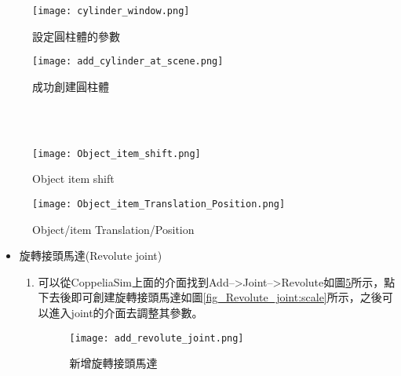 \documentclass[14pt,a4paper]{report}  %
\begin{document}
{{{\begin{itemize}
\begin{enumerate}
      \begin{figure}[hbt!]
        \centering
        \texttt{[image: cylinder\_window.png]} 
        \caption{設定圓柱體的參數}
        \label{fig_cylinder_window:scale}
      \end{figure}
      
      \begin{figure}[hbt!]
        \centering
        \texttt{[image: add\_cylinder\_at\_scene.png]} 
        \caption{成功創建圓柱體}
        \label{fig_add_cylinder_at_scene:scale}
      \end{figure}
      \hspace*{\fill} \\
      \hspace*{\fill} \\
      
      \begin{figure}[hbt!]
        \centering
        \texttt{[image: Object\_item\_shift.png]}
        \caption{Object item shift}
        \label{fig_Object_item_shift:scale}
      \end{figure}
        
      \begin{figure}[hbt!]
        \centering
        \texttt{[image: Object\_item\_Translation\_Position.png]}
        \caption{Object/item Translation/Position}
        \label{fig_Object_item_Translation_Position.png:scale}
        \end{figure}      
      
      	\end{enumerate}
      \end{itemize}
      
      \begin{itemize}
      \item 旋轉接頭馬達(Revolute joint)
      	\begin{enumerate}
      	\item{可以從CoppeliaSim上面的介面找到Add-->Joint-->Revolute如圖\ref{fig_add_revolute_joint:scale}所示，點下去後即可創建旋轉接頭馬達如圖\ref{fig_Revolute_joint:scale}所示，之後可以進入joint的介面去調整其參數。}
      		
      \begin{figure}[hbt!]
        \centering
        \texttt{[image: add\_revolute\_joint.png]}
        \caption{新增旋轉接頭馬達}
        \label{fig_add_revolute_joint:scale}
      \end{figure}
      \hspace*{\fill} \\
      \hspace*{\fill} \\
      

\end{enumerate}
\end{itemize}}}}
\end{document}
